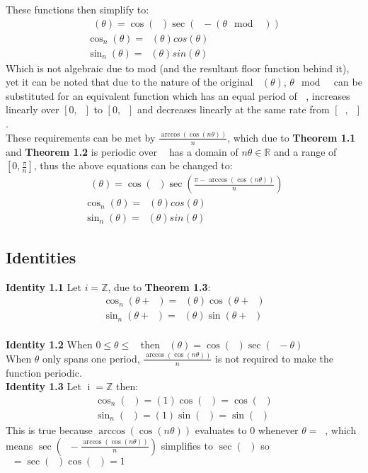 \documentclass[11pt]{article}
\DeclareMathOperator{\custd}{\mathrm{d}_n}
\DeclareMathOperator{\custh}{\mathrm{h}_n}
\DeclareMathOperator{\custi}{\mathrm{i}}
\DeclareMathOperator{\period}{\frac{2\pi}{n}}
\DeclareMathOperator{\hp}{\frac{\pi}{n}}
\DeclareMathOperator{\iperiod}{\custi\frac{2\pi}{n}}
\begin{document}
These functions then simplify to:
\begin{gather*}
   		\custd(\theta)=\cos(\hp)\sec(\hp-(\theta\mod\period))\\
   		\cos_n(\theta)=\custd(\theta)cos(\theta)\\
   		\sin_n(\theta)=\custd(\theta)sin(\theta)
\end{gather*}
Which is not algebraic due to mod (and the resultant floor function behind it), yet it can be noted that due to the nature of the original \(\custh(\theta)\), \(\theta\mod\period\) can be substituted for an equivalent function which has an equal period of \(\period\), increases linearly over \([0,\hp]\) to \([0,\hp]\) and decreases linearly at the same rate from \([\hp,\period]\).\\
These requirements can be met by \(\frac{\arccos(\cos(n\theta))}{n}\), which due to \textbf{Theorem 1.1} and \textbf{Theorem 1.2} is periodic over \(\period\) has a domain of \(n\theta\in\mathbb{R}\) and a range of \([0,\frac{\pi}{n}]\), thus the above equations can be changed to:
\begin{gather*}
   		\custd(\theta)=\cos(\hp)\sec(\frac{\pi-\arccos(\cos(n\theta))}{n})\\
   		\cos_n(\theta)=\custd(\theta)cos(\theta)\\
   		\sin_n(\theta)=\custd(\theta)sin(\theta)
\end{gather*}

\pagebreak

\subsection{Identities}
\textbf{Identity 1.1} Let \(i=\mathbb{Z}\), due to \textbf{Theorem 1.3}:
\begin{gather*}
	\cos_n(\theta+\iperiod) = \custd(\theta)\cos(\theta+\iperiod)\\
	\sin_n(\theta+\iperiod) = \custd(\theta)\sin(\theta+\iperiod)
\end{gather*} \\
\textbf{Identity 1.2} When \(0\leq\theta\leq\period\) then \(\custd(\theta)=\cos(\hp)\sec(\hp-\theta)\)\\
When \(\theta\) only spans one period, \(\frac{\arccos(\cos(n\theta))}{n}\) is not required to make the function periodic.\\
\textbf{Identity 1.3} Let \(\custi=\mathbb{Z}\) then:
\begin{gather*}
	\cos_n(\iperiod) = (1)\cos(\iperiod)=\cos(\iperiod)\\
	\sin_n(\iperiod) = (1)\sin(\iperiod)=\sin(\iperiod)
\end{gather*} 
This is true because \(\arccos(\cos(n\theta))\) evaluates to 0 whenever \(\theta=\iperiod\), which means \(\sec(\hp-\frac{\arccos(\cos(n\theta))}{n})\) simplifies to \(\sec(\hp)\) so \(\custd=\sec(\hp)\cos(\hp)=1\)
\end{document}
